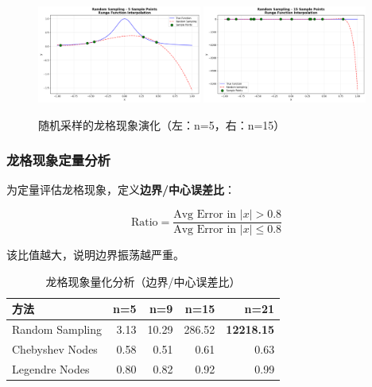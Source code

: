 \documentclass[a4paper,12pt]{article}
\theoremstyle{definition}
\begin{document}
\begin{figure}[H]
\centering
\includegraphics[width=0.48\textwidth]{results/task1/random_n5.png}
\includegraphics[width=0.48\textwidth]{results/task1/random_n15.png}
\caption{随机采样的龙格现象演化（左：n=5，右：n=15）}
\label{fig:task1_random_runge}
\end{figure}

\subsubsection{龙格现象定量分析}

为定量评估龙格现象，定义\textbf{边界/中心误差比}：

\begin{equation}
\text{Ratio} = \frac{\text{Avg Error in } |x| > 0.8}{\text{Avg Error in } |x| \leq 0.8}
\end{equation}

该比值越大，说明边界振荡越严重。

\begin{table}[H]
\centering
\caption{龙格现象量化分析（边界/中心误差比）}
\label{tab:runge_ratio}
\begin{tabular}{lrrrr}
\toprule
\textbf{方法} & \textbf{n=5} & \textbf{n=9} & \textbf{n=15} & \textbf{n=21} \\
\midrule
Random Sampling   & 3.13   & 10.29   & 286.52    & \textbf{12218.15} \\
\rowcolor{tablerowcolor}
Chebyshev Nodes   & 0.58   & 0.51    & 0.61      & 0.63 \\
Legendre Nodes    & 0.80   & 0.82    & 0.92      & 0.99 \\
\bottomrule
\end{tabular}
\end{table}
\end{document}
